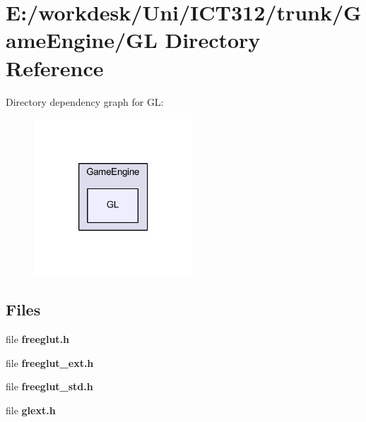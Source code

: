 \section{E\+:/workdesk/\+Uni/\+I\+C\+T312/trunk/\+Game\+Engine/\+G\+L Directory Reference}
\label{dir_6d47dc0c3744bff2ec322753ed315ed4}
Directory dependency graph for G\+L\+:\nopagebreak
\begin{figure}[H]
\begin{center}
\leavevmode
\includegraphics[width=169pt]{dir_6d47dc0c3744bff2ec322753ed315ed4_dep}
\end{center}
\end{figure}
\subsection*{Files}
\begin{DoxyCompactItemize}
\item 
file {\bf freeglut.\+h}
\item 
file {\bf freeglut\+\_\+ext.\+h}
\item 
file {\bf freeglut\+\_\+std.\+h}
\item 
file {\bf glext.\+h}
\end{DoxyCompactItemize}
